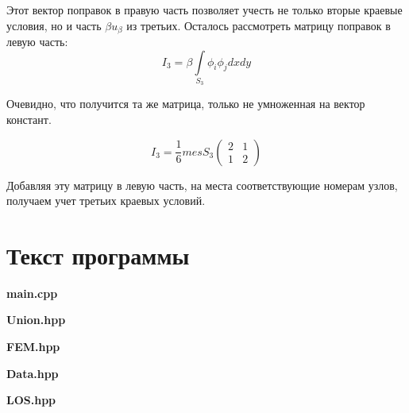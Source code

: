 \documentclass[12pt,a4paper]{article}
\begin{document}
\noindent Этот вектор поправок в правую
часть позволяет учесть не только вторые
краевые условия, но и часть
$\beta u_{\beta}$ из третьих.
Осталось рассмотреть матрицу
поправок в левую часть:
$$
I_3 = \beta \int \limits_{S_3}
\phi_i \phi_j dxdy
$$

\noindent Очевидно, что получится та же
матрица, только не умноженная на вектор
констант.

$$
I_3 = \frac{1}{6} mes S_3
\begin{pmatrix}
    2 & 1 \\
    1 & 2
\end{pmatrix}
$$

\noindent Добавляя эту матрицу в левую часть,
на места соответствующие номерам узлов,
получаем учет третьих краевых условий.


\section{Текст программы}
\begin{myquote}
    \begin{center}
        \textbf{main.cpp}
    \end{center}
\end{myquote}

\begin{myquote}
    \begin{center}
        \textbf{Union.hpp}
    \end{center}
\end{myquote}

\begin{myquote}
    \begin{center}
        \textbf{FEM.hpp}
    \end{center}
\end{myquote}

\begin{myquote}
    \begin{center}
        \textbf{Data.hpp}
    \end{center}
\end{myquote}

\begin{myquote}
    \begin{center}
        \textbf{LOS.hpp}
    \end{center}
\end{myquote}
\end{document}
